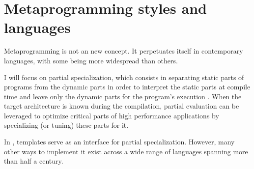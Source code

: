 \documentclass[../main]{subfiles}
\begin{document}
\section{
  Metaprogramming styles and languages
}

Metaprogramming is not an new concept. It perpetuates itself in contemporary
languages, with some being more widespread than others.

I will focus on partial specialization, which consists in separating
static parts of programs from the dynamic parts in order to interpret
the static parts at compile time and leave only the dynamic parts for the
program's execution \cite{10.1145/243439.243447, 10.1023/A:1010095604496}.
When the target architecture is known during the compilation, partial evaluation
can be leveraged to optimize critical parts of high performance applications
by specializing (or tuning) these parts for it.

In \cpp, templates serve as an interface for partial specialization.
However, many other ways to implement it exist across a wide range of languages
spanning more than half a century.
\end{document}
